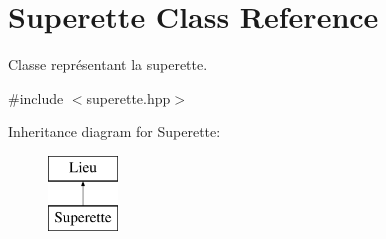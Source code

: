 \hypertarget{class_superette}{\section{Superette Class Reference}
\label{class_superette}
}


Classe représentant la superette.  




{\ttfamily \#include $<$superette.\-hpp$>$}

Inheritance diagram for Superette\-:\begin{figure}[H]
\begin{center}
\leavevmode
\includegraphics[height=2.000000cm]{class_superette}
\end{center}
\end{figure}
